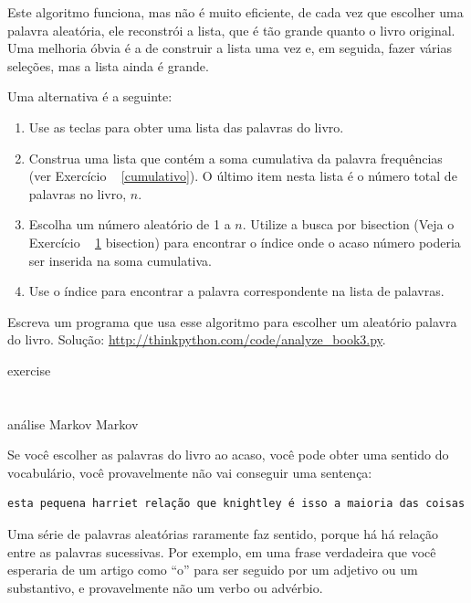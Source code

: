 \documentclass[10pt]{book}
\begin{document}
\begin{exercise}
\begin{v erbatim}
\begin{}
Este algoritmo funciona, mas não é muito eficiente, de cada vez que
escolher uma palavra aleatória, ele reconstrói a lista, que é tão grande quanto
o livro original. Uma melhoria óbvia é a de construir a lista
uma vez e, em seguida, fazer várias seleções, mas a lista ainda é grande.

Uma alternativa é a seguinte:

\begin{enumerate}

\item Use as teclas {\tt} para obter uma lista das palavras do livro.

\item Construa uma lista que contém a soma cumulativa da palavra
  frequências (ver Exercício ~ \ref {cumulativo}). O último item
  nesta lista é o número total de palavras no livro, $ n $.
  
\item Escolha um número aleatório de 1 a $ n $. Utilize a busca por bisection
  (Veja o Exercício ~ \ref {} bisection) para encontrar o índice onde o acaso
  número poderia ser inserida na soma cumulativa.

\item Use o índice para encontrar a palavra correspondente na lista de palavras.

\end{enumerate}

Escreva um programa que usa esse algoritmo para escolher um aleatório
palavra do livro. Solução: \url{http://thinkpython.com/code/analyze_book3.py}.

\end{} exercise



\section{} análise Markov
\label{} Markov

Se você escolher as palavras do livro ao acaso, você pode obter uma
sentido do vocabulário, você provavelmente não vai conseguir uma sentença:

\begin{verbatim}
esta pequena harriet relação que knightley é isso a maioria das coisas
\end{verbatim}
%
Uma série de palavras aleatórias raramente faz sentido, porque há
há relação entre as palavras sucessivas. Por exemplo, em
uma frase verdadeira que você esperaria de um artigo como ``o'' para
ser seguido por um adjetivo ou um substantivo, e provavelmente não um verbo
ou advérbio.


\end{v erbatim}
\end{exercise}
\end{document}
